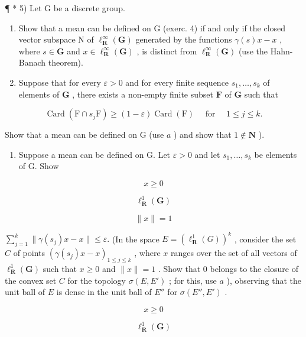 ¶ * 5) Let G be a discrete group.

\begin{enumerate}
\def\labelenumi{\alph{enumi})}
\item
  Show that a mean can be defined on G (exerc. 4) if and only if the closed vector subspace N of \(\ell_{\mathbf{R}}^{\infty}(\mathbf{G})\) generated by the functions \(\gamma(s)x - x\) , where \(s \in \mathbf{G}\) and \(x \in \ell_{\mathbf{R}}^{\infty}(\mathbf{G})\) , is distinct from \(\ell_{\mathbf{R}}^{\infty}(\mathbf{G})\) (use the Hahn-Banach theorem).
\item
  Suppose that for every \(\varepsilon > 0\) and for every finite sequence \(s_1, \ldots, s_k\) of elements of \(\mathbf{G}\) , there exists a non-empty finite subset \(\mathbf{F}\) of \(\mathbf{G}\) such that
\end{enumerate}

\[
\operatorname{Card} (\mathrm{F} \cap s _ {j} \mathrm{F}) \geqslant (1 - \varepsilon) \operatorname{Card} (\mathrm{F}) \quad \text { for } \quad 1 \leqslant j \leqslant k.
\]

Show that a mean can be defined on G (use \(a\) ) and show that \(1 \notin \mathbf{N}\) ).

\begin{enumerate}
\def\labelenumi{\alph{enumi})}
\setcounter{enumi}{2}
\tightlist
\item
  Suppose a mean can be defined on G. Let \(\varepsilon > 0\) and let \(s_1, \ldots, s_k\) be elements of G. Show
\end{enumerate}

\[
x \geqslant 0
\]

\[
\ell_ {\mathbf {R}} ^ {1} (\mathbf {G})
\]

\[
\| x \| = 1
\]

\(\sum_{j=1}^{k}\|\gamma(s_j)x - x\| \leqslant \varepsilon.\) (In the space \(E = (\ell_{\mathbf{R}}^1(G))^k\) , consider the set \(C\) of points \((\gamma(s_j)x - x)_{1\leqslant j\leqslant k}\) , where \(x\) ranges over the set of all vectors of \(\ell_{\mathbf{R}}^{1}(\mathbf{G})\) such that \(x \geqslant 0\) and \(\| x \| = 1\) . Show that 0 belongs to the closure of the convex set \(C\) for the topology \(\sigma(E, E')\) ; for this, use \(a\) ), observing that the unit ball of \(E\) is dense in the unit ball of \(E''\) for \(\sigma(E'', E')\) .

\[
x \geqslant 0
\]

\[
\ell_ {\mathbf {R}} ^ {1} (\mathbf {G})
\]

